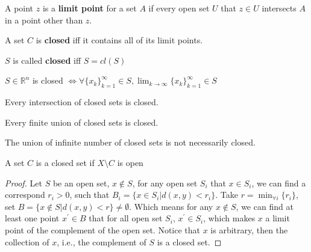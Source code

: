 				\begin{definition}
					A point $z$ is a \textbf{limit point} for a set $A$ if every open set $U$ that $z\in U$ intersects $A$ in a point other than $z$.
				\end{definition}


				\begin{definition}
					A set $C$ is \textbf{closed} iff it contains all of its limit points.
				\end{definition}

				$S$ is called \textbf{closed} iff $S=cl(S)$

				\begin{theorem}
					$S\in \mathbb{R}^n$ is closed $\iff \forall \{x_k\}_{k=1}^\infty \in S, \lim_{k \rightarrow \infty} \{x_k\}_{k=1}^\infty \in S$
				\end{theorem}

				\begin{theorem}
					Every intersection of closed sets is closed.
				\end{theorem}

				\begin{theorem}
					Every finite union of closed sets is closed.
				\end{theorem}

				\begin{remark}
					The union of infinite number of closed sets is not necessarily closed.
				\end{remark}

				\begin{theorem}
					A set $C$ is a closed set if $X \setminus C$ is open
				\end{theorem}

				\begin{proof}
					Let $S$ be an open set, $x \notin S$, for any open set $S_i$ that $x\in S_i$, we can find a correspond $r_i > 0$, such that $B_i = \{x \in S_i | d(x, y) < r_i\}$. Take $r = \min_{\forall i}\{r_i\}$, set $B = \{x \notin S|d(x, y) < r\} \neq \emptyset$. Which means for any $x\notin S$, we can find at least one point $x^\prime \in B$ that for all open set $S_i$, $x^\prime \in S_i$, which makes $x$ a limit point of the complement of the open set. Notice that $x$ is arbitrary, then the collection of $x$, i.e., the complement of $S$ is a closed set.
				\end{proof}

